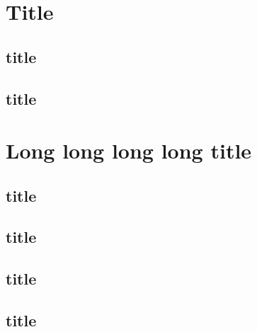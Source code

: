 \documentclass{book}
\begin{document}
\tableofcontents

\chapter{Title}
\section{title} \section{title}

\chapter[Long long long \protect\\long title]{Long long long long title}
\section{title} \section{title}
\section{title} \section{title}
\end{document}
